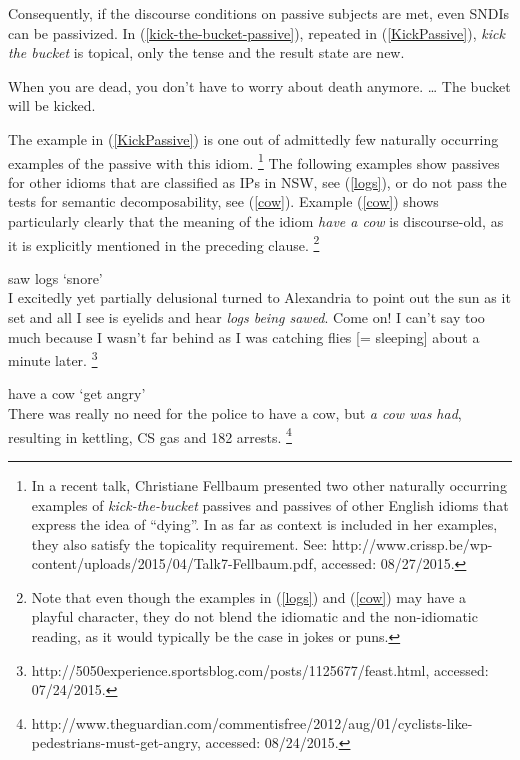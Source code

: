 \documentclass[output=paper]{langsci/langscibook}
\begin{document}
Consequently, if the discourse conditions  on passive subjects are met, even  SNDIs can be passivized. In (\ref{kick-the-bucket-passive}), repeated in (\ref{KickPassive}), \textit{kick the bucket} is topical, only the tense and the result state are new. 

\begin{exe}
\ex When you are dead, you don't have to worry about death anymore. \ldots
The bucket will be kicked.\label{KickPassive}
\end{exe}

The example in (\ref{KickPassive}) is one out of admittedly few naturally occurring examples of the passive with this idiom.%
\footnote{In a recent talk,   Christiane Fellbaum presented two other naturally occurring examples of \textit{kick-the-bucket} passives and passives of other English idioms that express the idea of ``dying''. In as far as context is included in her examples, they also satisfy the  topicality requirement. See: http://www.crissp.be/wp-content/uploads/2015/04/Talk7-Fellbaum.pdf, accessed: 08/27/2015.}
%
The following examples show  passives for other idioms that are classified as IPs in NSW, see (\ref{logs}), or do not pass the tests for semantic decomposability, see (\ref{cow}). Example (\ref{cow}) shows particularly clearly that the meaning of the idiom \textit{have a cow} is discourse-old, as it is explicitly mentioned in the preceding clause.%
\footnote{Note that even though the examples in  (\ref{logs}) and (\ref{cow}) may have a playful character, they do not blend the idiomatic and the non-idiomatic reading, 
as it would typically be the case in jokes or puns.
}

\begin{exe}
\ex saw logs `snore'\label{logs}\\
I excitedly yet partially delusional turned to Alexandria to point out the sun as it set and all I see is eyelids and hear \emph{logs being sawed}. Come on! I can't say too much because I wasn't far behind as I was catching flies [= sleeping] about a minute later.%
\footnote{http://5050experience.sportsblog.com/posts/1125677/feast.html, accessed: 07/24/2015.}
\end{exe}

\begin{exe}
\ex have a cow `get angry'\label{cow} \\ 
There was really no need for the police to have a cow, but \emph{a cow was had}, resulting in kettling, CS gas and 182 arrests.%
\footnote{http://www.theguardian.com/commentisfree/2012/aug/01/cyclists-like-pedestrians-must-get-angry, accessed: 08/24/2015.}
\end{exe}
\end{document}
